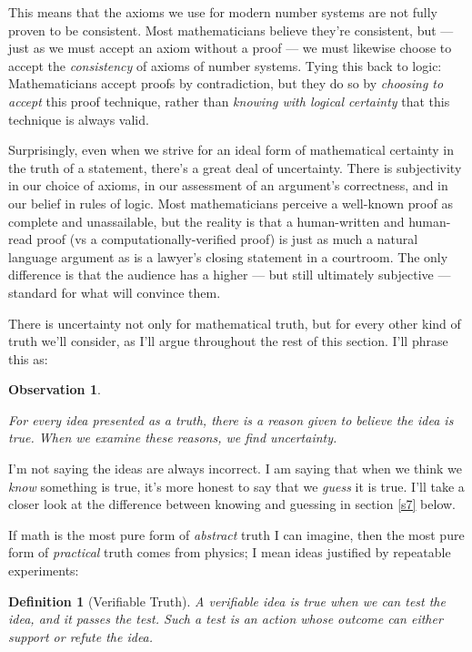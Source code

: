 \documentclass[11pt, oneside]{article}
\newtheorem*{defn}{Definition}
\newtheorem{obs}{Observation}
\theoremstyle{argtstyle}
\begin{document}
\begin{itemize}
        This means that the axioms we use for
        modern number systems are
        not fully proven to be consistent.
        Most mathematicians believe they're
        consistent, but --- just as we
        must accept an axiom without a proof ---
        we must likewise choose to accept
        the {\em consistency} of axioms of number
        systems.
        Tying this back to logic: Mathematicians
        accept proofs by contradiction, but they
        do so by {\em choosing to accept} this
        proof technique, rather than
        {\em knowing with logical certainty} that this
        technique is always valid.
\end{itemize}

Surprisingly,
even when we strive for an ideal form of
mathematical certainty in the truth of a statement, there's a great deal of
uncertainty.
There is subjectivity in our choice of axioms,
in our assessment of an argument's correctness,
and
in our belief in rules of logic.
Most mathematicians perceive a well-known proof as complete and unassailable,
but the reality is that a human-written and human-read proof (vs
a computationally-verified proof) is just as much a natural language argument as
is a lawyer's closing statement in a courtroom.
The only difference is that the audience has a higher --- but still ultimately
subjective --- standard for what will convince them.

There is uncertainty not only for mathematical truth, but for
every other kind of truth we'll consider, as I'll argue throughout
the rest of this section.
I'll phrase this as:

\newcommand{\obsone}{
    For every idea presented as a truth, there is a reason
    given to believe the idea is true.
    When we examine these reasons, we find uncertainty.
}
\begin{obs}\label{o1}
    \obsone
\end{obs}

I'm not saying the ideas are always incorrect. I am saying that when we think we
{\em know} something is true, it's more honest to say that we {\em guess} it is
true. I'll take a closer look at
the difference between knowing and guessing in section \ref{s7} below.

If math is the most pure form of {\em abstract} truth I can imagine, then the
most pure form of {\em practical} truth comes from physics; I mean ideas
justified by repeatable experiments:

\begin{defn}[Verifiable Truth]
    A verifiable idea is true when we can test the idea, and it passes
    the test. Such a test is an action whose outcome
    can either support or refute the idea.
\end{defn}
\end{document}
